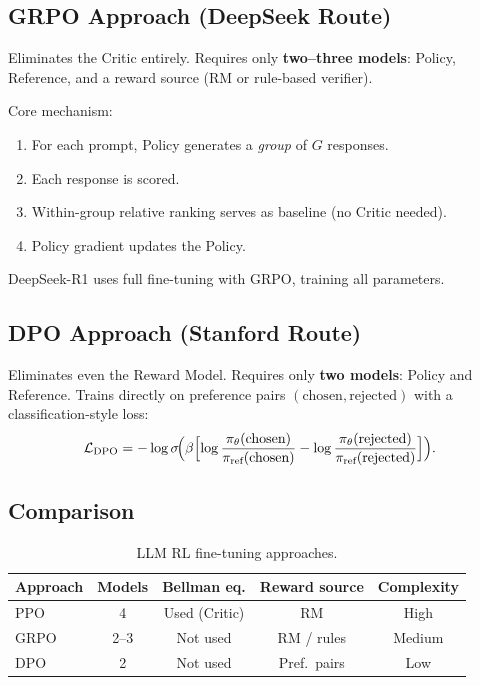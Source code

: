 \subsection{GRPO Approach (DeepSeek Route)}

Eliminates the Critic entirely.
Requires only \textbf{two--three models}: Policy, Reference, and a reward source (RM or rule-based verifier).

Core mechanism:
\begin{enumerate}
  \item For each prompt, Policy generates a \emph{group} of $G$ responses.
  \item Each response is scored.
  \item Within-group relative ranking serves as baseline (no Critic needed).
  \item Policy gradient updates the Policy.
\end{enumerate}

DeepSeek-R1 uses full fine-tuning with GRPO, training all parameters.

\subsection{DPO Approach (Stanford Route)}

Eliminates even the Reward Model.
Requires only \textbf{two models}: Policy and Reference.
Trains directly on preference pairs $(\text{chosen}, \text{rejected})$ with a classification-style loss:
\[
  \mathcal{L}_{\text{DPO}} = -\log\sigma\!\Bigl(\beta\Bigl[
    \log\frac{\pi_\theta(\text{chosen})}{\pi_{\text{ref}}(\text{chosen})}
    - \log\frac{\pi_\theta(\text{rejected})}{\pi_{\text{ref}}(\text{rejected})}
  \Bigr]\Bigr).
\]

\subsection{Comparison}

\begin{table}[htbp]
\centering
\caption{LLM RL fine-tuning approaches.}
\begin{tabular}{@{}lcccc@{}}
\toprule
\textbf{Approach} & \textbf{Models} & \textbf{Bellman eq.} & \textbf{Reward source} & \textbf{Complexity} \\
\midrule
PPO & 4 & Used (Critic) & RM & High \\
GRPO & 2--3 & Not used & RM / rules & Medium \\
DPO & 2 & Not used & Pref.\ pairs & Low \\
\bottomrule
\end{tabular}
\end{table}

